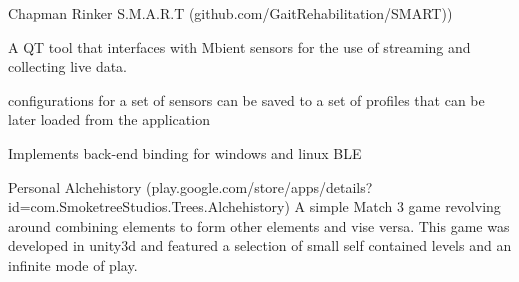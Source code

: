 

\begin{cventries}

  \cventry
    {Chapman Rinker} %
    {S.M.A.R.T ({\tiny github.com/GaitRehabilitation/SMART)})} %
    {} %
    {} %
    {
      \begin{cvitems} %
        \item {A QT tool that interfaces with Mbient sensors for the use of streaming and collecting live data.}
        \item{configurations for a set of sensors can be saved to a set of profiles that can be later loaded from the application}
        \item{Implements back-end binding for windows and linux BLE}
      \end{cvitems}
    }

\cventry
    {Personal} %
    {Alchehistory ({\tiny play.google.com/store/apps/details?id=com.SmoketreeStudios.Trees.Alchehistory})} %
    {} %
    {} %
    {
      A simple Match 3 game revolving around combining elements to form other elements and vise versa. This game was developed in unity3d and featured a selection of small self contained levels and an infinite mode of play.
    }

\end{cventries}
